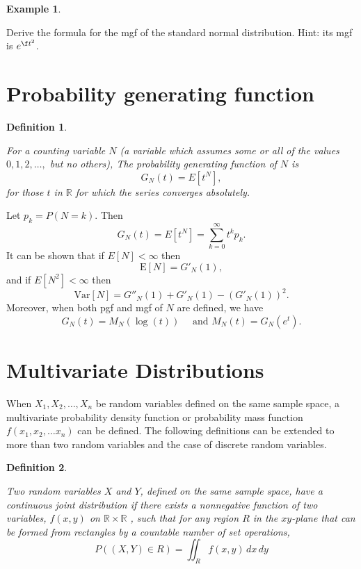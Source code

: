 \documentclass[
]{book}
\theoremstyle{definition}
\newtheorem{definition}{Definition}[chapter]
\theoremstyle{definition}
\newtheorem{example}{Example}[chapter]
\theoremstyle{definition}
\theoremstyle{definition}
\theoremstyle{remark}
\begin{document}
\begin{example}
\protect\hypertarget{exm:unlabeled-div-16}{}\label{exm:unlabeled-div-16}

Derive the formula for the mgf of the standard normal distribution.
Hint: its mgf is \(e^{\f t^2}\).

\end{example}

\hypertarget{probability-generating-function}{%
\section{Probability generating function}\label{probability-generating-function}}

\begin{definition}
\protect\hypertarget{def:unlabeled-div-17}{}\label{def:unlabeled-div-17}

\emph{For a counting variable \(N\) (a variable which
assumes some or all of the values \(0, 1, 2, \ldots,\) but no others), The
probability generating function of \(N\) is \[G_N(t) = E[t^N],\] for those
\(t\) in \(\mathbb{R}\) for which the series converges absolutely. }

\end{definition}

Let \(p_k = P(N = k)\). Then
\[G_N(t) = E[t^N] = \sum_{k=0}^\infty t^k p_k.\] It can be shown that if
\(E[N] < \infty\) then \[\mathrm{E}[N] = G'_N(1),\] and if
\(E[N^2] < \infty\) then
\[\mathrm{Var}[N] = G''_N(1) + G'_N(1) - (G'_N(1))^2.\] Moreover, when
both pgf and mgf of \(N\) are defined, we have
\[G_N(t) = M_N(\log(t)) \quad \text{ and } M_N(t) = G_N(e^t).\]

\hypertarget{multivariate-distributions}{%
\section{Multivariate Distributions}\label{multivariate-distributions}}

When \(X_1,X_2,\ldots ,X_n\) be random variables defined on the same
sample space, a multivariate probability density function or probability
mass function\\
\(f(x_1, x_2, \ldots x_n)\) can be defined. The following definitions can
be extended to more than two random variables and the case of discrete
random variables.

\begin{definition}
\protect\hypertarget{def:unlabeled-div-18}{}\label{def:unlabeled-div-18}

\emph{Two random variables \(X\) and \(Y\), defined on the
same sample space, have a continuous joint distribution if there exists
a nonnegative function of two variables, \(f(x, y)\) on
\(\mathbb{R} \times \mathbb{R}\) , such that for any region \(R\) in the
\(xy\)-plane that can be formed from rectangles by a countable number of
set operations, \[P((X, Y)  \in R) = \iint_R f(x,y) \, dx\, dy\] }

\end{definition}
\end{document}
